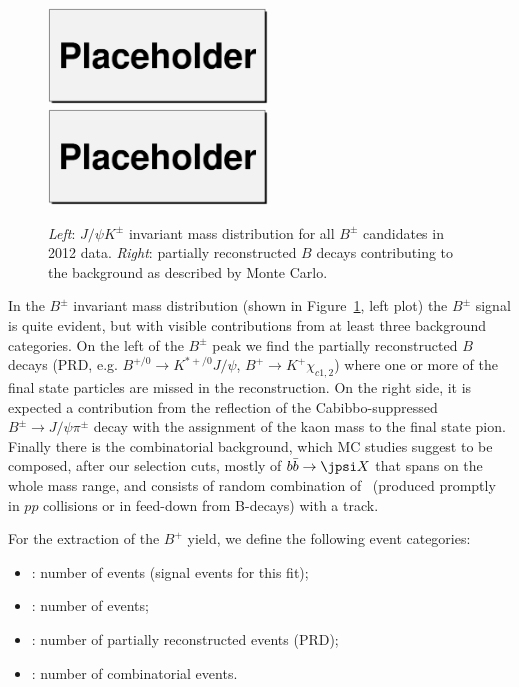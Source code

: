 \begin{figure}[!htb]
    \begin{center}
	\hspace{-0.5cm}
	\includegraphics[width=0.52\textwidth]{dataonlyN3.eps}
	\hspace{-0.5cm}
	\includegraphics[width=0.52\textwidth]{mcprdN3.eps}
	\caption{{\it Left}: $J/\psi K^{\pm}$ invariant mass distribution for all $B^{\pm}$
	    candidates in 2012 data.
	    {\it Right}: partially reconstructed $B$ decays contributing to the background
	as described by Monte Carlo.}
	\label{fig:bplusinvmass}
    \end{center}
\end{figure}

In the $B^\pm$ invariant mass distribution (shown in Figure~\ref{fig:bplusinvmass},
left plot) the $B^\pm$ signal is quite evident, but with visible contributions
from at least three background categories. On the left of the $B^\pm$ peak
we find the partially reconstructed $B$ decays
(PRD, e.g. $B^{+/0} \to K^{*+/0} J/\psi$, $B^{+} \to K^{+} \chi_{c1,2}$) 
where one or more of the final state particles are missed in the reconstruction.
On the right side, it is expected a contribution from the reflection of the
Cabibbo-suppressed $B^\pm\to J/\psi\pi^\pm$ decay with the assignment of the
kaon mass to the final state pion.
Finally there is the combinatorial background, which MC studies suggest to be composed,
after our selection cuts, mostly of $b\bar{b}\to \jpsi X$ that spans on the whole mass
range, and consists of random combination of \jpsi\ (produced promptly in $pp$ collisions
or in feed-down from B-decays) with a track.

For the extraction of the $B^+$ yield, we define the following event categories:
\begin{itemize}
    \setlength{\itemsep}{0pt}%
	\setlength{\parskip}{0pt}%
    \item \NJpsiK{}: number of \BpmKpmJpsi{} events (signal events for this fit);
    \item \NJpsipi{}: number of \BpPipJpsi{} events;
    \item \Npr{}: number of partially reconstructed events (PRD);
    \item \Nc{}: number of combinatorial events.
\end{itemize}

